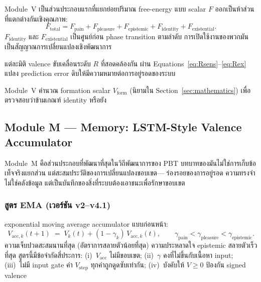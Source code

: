 \documentclass[12pt,a4paper]{article}
\newcommand{\Vform}{V_{\mathrm{form}}}
\newcommand{\pp}[1]{\textbf{#1}}
\begin{document}
\begin{description}[leftmargin=1.4em]
  \item[\pp{บทบาท~1 --- Free-energy decomposition.}]
    Module~V เป็นส่วนประกอบแรกที่แยกย่อยปริมาณ free-energy แบบ scalar
    $F$ ออกเป็นห้าส่วนที่แตกต่างกันเชิงคุณภาพ:
    \begin{equation}
      F_{\mathrm{total}} = F_{\mathrm{pain}} + F_{\mathrm{pleasure}}
      + F_{\mathrm{epistemic}} + F_{\mathrm{identity}} + F_{\mathrm{existential}}.
      \label{eq:F_decomp}
    \end{equation}
    $F_{\mathrm{identity}}$ และ $F_{\mathrm{existential}}$ เป็นศูนย์ก่อน
    phase transition ตามลำดับ การเปิดใช้งานของพวกมันเป็นสัญญาณการเปลี่ยนแปลงเชิงพัฒนาการ
  \item[\pp{บทบาท~2 --- $\mathbf{V}\!\to\!R$ mapping.}]
    แต่ละมิติ valence ขับเคลื่อนระดับ $R$ ที่สอดคล้องกัน
    ผ่าน Equations~\ref{eq:Rsens}--\ref{eq:Rex}
    แปลง prediction error ดิบให้มีความหมายต่อการอยู่รอดของระบบ
  \item[\pp{บทบาท~3 --- Phase-transition monitoring.}]
    Module~V คำนวณ formation scalar $\Vform$ (นิยามใน Section~\ref{sec:mathematics})
    เพื่อตรวจสอบว่าข้ามเกณฑ์ identity หรือยัง
\end{description}

\subsection{Module M --- Memory: LSTM-Style Valence Accumulator}

Module~M คือส่วนประกอบที่พัฒนาที่สุดในวิถีพัฒนาการของ PBT
บทบาทของมันไม่ใช่การเก็บข้อเท็จจริงแยกส่วน แต่สะสมประวัติของการเปลี่ยนแปลงขอบเขต---
ร่องรอยของการอยู่รอด ความทรงจำไม่ใช่คลังข้อมูล
แต่เป็นบันทึกของสิ่งที่ระบบต้องเอาชนะเพื่อรักษาขอบเขต

\subsubsection{สูตร EMA (เวอร์ชัน v2--v4.1)}

exponential moving average accumulator แบบก่อนหน้า:
\begin{equation}
  V_{\mathrm{acc},k}(t{+}1) \;=\; V_k(t) + (1-\gamma_k)\,V_{\mathrm{acc},k}(t),
  \qquad \gamma_{\mathrm{pain}} < \gamma_{\mathrm{pleasure}} < \gamma_{\mathrm{epistemic}}.
  \label{eq:EMA}
\end{equation}
ความเจ็บปวดสะสมนานที่สุด (อัตราการสลายตัวน้อยที่สุด)
ความประหลาดใจ epistemic สลายตัวเร็วที่สุด
สูตรนี้มีข้อจำกัดสี่ประการ: (i)~$V_{\mathrm{acc}}$ ไม่มีขอบเขต;
(ii)~$\gamma$ คงที่ไม่ขึ้นกับเนื้อหา input; (iii)~ไม่มี input gate
ค่า $V_{\mathrm{step}}$ ทุกค่าถูกดูดซับเท่ากัน;
(iv)~บังคับให้ $V\ge 0$ ป้องกัน signed valence
\end{document}
